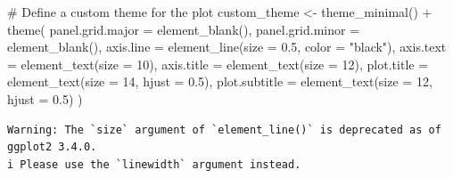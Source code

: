 \documentclass[
  letterpaper,
  DIV=11,
  numbers=noendperiod]{scrartcl}
\newenvironment{Shaded}{\begin{snugshade}}{\end{snugshade}}
\newcommand{\AttributeTok}[1]{\textcolor[rgb]{0.40,0.45,0.13}{#1}}
\newcommand{\CommentTok}[1]{\textcolor[rgb]{0.37,0.37,0.37}{#1}}
\newcommand{\DecValTok}[1]{\textcolor[rgb]{0.68,0.00,0.00}{#1}}
\newcommand{\FloatTok}[1]{\textcolor[rgb]{0.68,0.00,0.00}{#1}}
\newcommand{\FunctionTok}[1]{\textcolor[rgb]{0.28,0.35,0.67}{#1}}
\newcommand{\NormalTok}[1]{\textcolor[rgb]{0.00,0.23,0.31}{#1}}
\newcommand{\OtherTok}[1]{\textcolor[rgb]{0.00,0.23,0.31}{#1}}
\newcommand{\SpecialCharTok}[1]{\textcolor[rgb]{0.37,0.37,0.37}{#1}}
\newcommand{\StringTok}[1]{\textcolor[rgb]{0.13,0.47,0.30}{#1}}
\begin{document}
\begin{Shaded}
\begin{Highlighting}[]
\CommentTok{\# Define a custom theme for the plot}
\NormalTok{custom\_theme }\OtherTok{\textless{}{-}} \FunctionTok{theme\_minimal}\NormalTok{() }\SpecialCharTok{+}
  \FunctionTok{theme}\NormalTok{(}
    \AttributeTok{panel.grid.major =} \FunctionTok{element\_blank}\NormalTok{(),}
    \AttributeTok{panel.grid.minor =} \FunctionTok{element\_blank}\NormalTok{(),}
    \AttributeTok{axis.line =} \FunctionTok{element\_line}\NormalTok{(}\AttributeTok{size =} \FloatTok{0.5}\NormalTok{, }\AttributeTok{color =} \StringTok{"black"}\NormalTok{),}
    \AttributeTok{axis.text =} \FunctionTok{element\_text}\NormalTok{(}\AttributeTok{size =} \DecValTok{10}\NormalTok{),}
    \AttributeTok{axis.title =} \FunctionTok{element\_text}\NormalTok{(}\AttributeTok{size =} \DecValTok{12}\NormalTok{),}
    \AttributeTok{plot.title =} \FunctionTok{element\_text}\NormalTok{(}\AttributeTok{size =} \DecValTok{14}\NormalTok{, }\AttributeTok{hjust =} \FloatTok{0.5}\NormalTok{),}
    \AttributeTok{plot.subtitle =} \FunctionTok{element\_text}\NormalTok{(}\AttributeTok{size =} \DecValTok{12}\NormalTok{, }\AttributeTok{hjust =} \FloatTok{0.5}\NormalTok{)}
\NormalTok{  )}
\end{Highlighting}
\end{Shaded}

\begin{verbatim}
Warning: The `size` argument of `element_line()` is deprecated as of ggplot2 3.4.0.
i Please use the `linewidth` argument instead.
\end{verbatim}

\begin{Shaded}
\end{Shaded}
\end{document}

